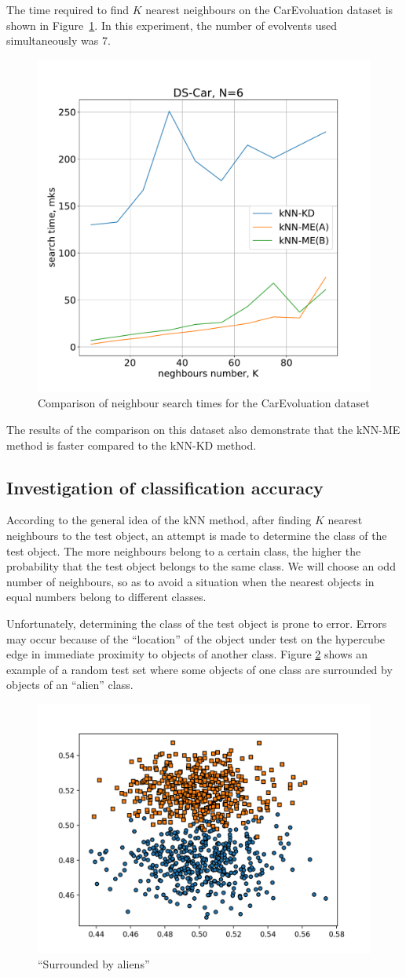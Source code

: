 \documentclass[entropy,article,submit,moreauthors,pdftex]{Definitions/mdpi}
\begin{document}
\begin{paracol}{2}
The time required to find $K$ nearest neighbours on the CarEvoluation dataset is shown in Figure~\ref{fig6a}. In this experiment, the number of evolvents used simultaneously was 7. 
\begin{figure}
\widefigure
\includegraphics[width=0.5\linewidth]{fig6a.pdf}
\caption{Comparison of neighbour search times for the CarEvoluation dataset\label{fig6a}}
\end{figure}
The results of the comparison on this dataset also demonstrate that the kNN-ME method is faster compared to the kNN-KD method.

\subsection{Investigation of classification accuracy}

According to the general idea of the kNN method, after finding $K$ nearest neighbours to the test object, an attempt is made to determine the class of the test object. The more neighbours belong to a certain class, the higher the probability that the test object belongs to the same class. We will choose an odd number of neighbours, so as to avoid a situation when the nearest objects in equal numbers belong to different classes.

Unfortunately, determining the class of the test object is prone to error. Errors may occur because of the ``location'' of the object under test on the hypercube edge in immediate proximity to objects of another class. Figure \ref{fig7} shows an example of a random test set where some objects of one class are surrounded by objects of an ``alien'' class.

\begin{figure}[h]
\widefigure
\includegraphics[width=0.7\linewidth]{fig7.png}
\caption{``Surrounded by aliens''\label{fig7}}
\end{figure}


\end{paracol}
\end{document}
